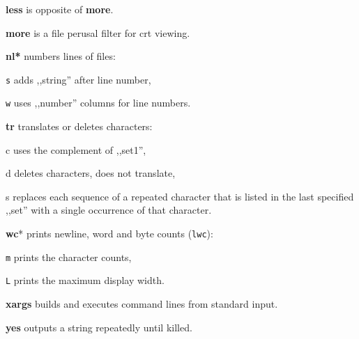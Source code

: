 \begin{enumx}
	\item [\cmd] \textbf{less} is opposite of \textbf{more}.
	\item [\cmd] \textbf{more} is a file perusal filter for crt viewing.
\end{enumx}

\begin{enumx}
	\item [\cmd] \textbf{nl*} numbers lines of files:
	\item [\texttt{s}] adds ,,string'' after line number,
	\item [\texttt{w}] uses ,,number'' columns for line numbers.
\end{enumx}

\begin{enumx}
	\item [\cmd] \textbf{tr} translates or deletes characters:
	\item [c] uses the complement of ,,set1'',
	\item [d] deletes characters, does not translate,
	\item [s] replaces each sequence of a repeated character that is listed 
	in the last specified ,,set'' with a single occurrence of that character.
\end{enumx}


\begin{enumx}
	\item [\cmd] \textbf{wc}* prints newline, word and byte counts (\texttt{lwc}):
	\item [\texttt{m}] prints the character counts,
	\item [\texttt{L}] prints the maximum display width.
\end{enumx}

\begin{enumx}
	\item [\cmd] \textbf{xargs} builds and executes command lines from standard input.
\end{enumx}

\begin{enumx}
	\item [\cmd] \textbf{yes} outputs a string repeatedly until killed.
\end{enumx}
